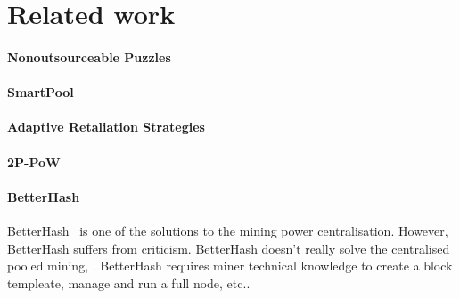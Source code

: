 \section{Related work}


\paragraph{Nonoutsourceable Puzzles}

\paragraph{SmartPool}

\paragraph{Adaptive Retaliation Strategies}

\paragraph{2P-PoW}

\paragraph{BetterHash}
BetterHash~\cite{draft-bip-BetterHash} is one of the solutions to the mining power centralisation.
However, BetterHash suffers from criticism.
BetterHash doesn't really solve the centralised pooled mining, .
BetterHash requires miner technical knowledge to create a block templeate, manage and run a full node, etc..
